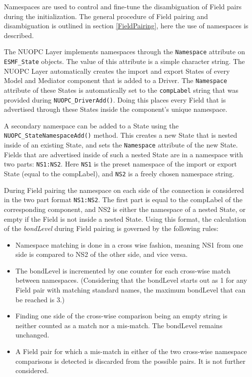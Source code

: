 %

\label{Namespaces}

Namespaces are used to control and fine-tune the disambiguation of Field pairs during the initialization. The general procedure of Field pairing and disambiguation is outlined in section \ref{FieldPairing}, here the use of namespaces is described.

The NUOPC Layer implements namespaces through the {\tt Namespace} attribute on {\tt ESMF\_State} objects. The value of this attribute is a simple character string. The NUOPC Layer automatically creates the import and export States of every Model and Mediator component that is added to a Driver. The {\tt Namespace} attribute of these States is automatically set to the {\tt compLabel} string that was provided during {\tt NUOPC\_DriverAdd()}. Doing this places every Field that is advertised through these States inside the component's unique namespace.

A secondary namespace can be added to a State using the {\tt NUOPC\_StateNamespaceAdd()} method. This creates a new State that is nested inside of an existing State, and sets the {\tt Namespace} attribute of the new State. Fields that are advertised inside of such a nested State are in a namespace with two parts: {\tt NS1:NS2}. Here {\tt NS1} is the preset namespace of the import or export State (equal to the compLabel), and {\tt NS2} is a freely chosen namespace string.

During Field pairing the namespace on each side of the connection is considered in the two part format {\tt NS1:NS2}. The first part is equal to the compLabel of the corresponding component, and NS2 is either the namespace of a nested State, or empty if the Field is not inside a nested State. Using this format, the calculation of the {\em bondLevel} during Field pairing is governed by the following rules:

\begin{itemize}
\item Namespace matching is done in a cross wise fashion, meaning NS1 from one side is compared to NS2 of the other side, and vice versa.
\item The bondLevel is incremented by one counter for each cross-wise match between namespaces. (Considering that the bondLevel starts out as 1 for any Field pair with matching standard names, the maximum bondLevel that can be reached is 3.)
\item Finding one side of the cross-wise comparison being an empty string is neither counted as a match nor a mis-match. The bondLevel remains unchanged.
\item A Field pair for which a mis-match in either of the two cross-wise namespace comparisons is detected is discarded from the possible pairs. It is not further considered.
\end{itemize}

